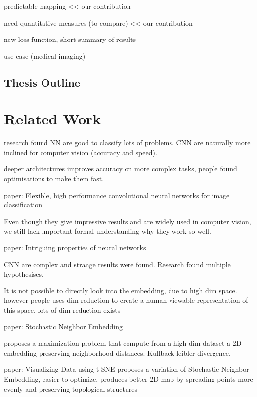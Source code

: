 \documentclass[a4paper,12pt]{report}
\begin{document}
predictable mapping << our contribution

need quantitative measures (to compare) << our contribution

new loss function, short summary of results

use case (medical imaging)

\section{Thesis Outline}


\chapter{Related Work}

research found NN are good to classify lots of problems.
CNN are naturally more inclined for computer vision (accuracy and speed).

deeper architectures improves accuracy on more complex tasks, people found optimisations to make them fast.

paper: Flexible, high performance convolutional neural networks for image classification

Even though they give impressive results and are widely used in computer vision, we still lack important formal understanding why they work so well.

paper: Intriguing properties of neural networks

CNN are complex and strange results were found.
Research found multiple hypothesises.


It is not possible to directly look into the embedding, due to high dim space.
however people uses dim reduction to create a human viewable representation of this space.
lots of dim reduction exists

paper: Stochastic Neighbor Embedding

proposes a maximization problem that compute from a high-dim dataset a 2D embedding preserving neighborhood distances.
Kullback-leibler divergence.

paper: Visualizing Data using t-SNE
proposes a variation of Stochastic Neighbor Embedding, easier to optimize, produces better 2D map by spreading points more evenly and preserving topological structures
\end{document}
